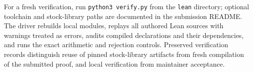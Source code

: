 \documentclass[10pt]{article}
\begin{document}
For a fresh verification, run \texttt{python3 verify.py} from the \texttt{lean} directory; optional toolchain and stock-library paths are documented in the submission README. The driver rebuilds local modules, replays all authored Lean sources with warnings treated as errors, audits compiled declarations and their dependencies, and runs the exact arithmetic and rejection controls. Preserved verification records distinguish reuse of pinned stock-library artifacts from fresh compilation of the submitted proof, and local verification from maintainer acceptance.
\end{document}
